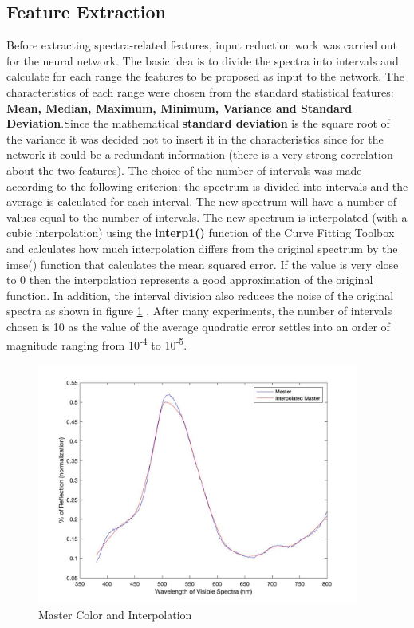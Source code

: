 \documentclass{article}
\begin{document}
\subsection{Feature Extraction} 
Before extracting spectra-related features, input reduction work was carried out for the neural network. The basic idea is to divide the spectra into intervals and calculate for each range the features to be proposed as input to the network. The characteristics of each range were chosen from the standard statistical features: \textbf{Mean, Median, Maximum, Minimum, Variance and Standard Deviation}.Since the mathematical \textbf{standard deviation} is the square root of the variance it was decided not to insert it in the characteristics since for the network it could be a redundant information (there is a very strong correlation about the two features). The choice of the number of intervals was made according to the following criterion: the spectrum is divided into intervals and the average is calculated for each interval. The new spectrum will have a number of values equal to the number of intervals. The new spectrum is interpolated (with a cubic interpolation) using the \textbf{interp1()} function of the Curve Fitting Toolbox and calculates how much interpolation differs from the original spectrum by the imse() function that calculates the mean squared error. If the value is very close to 0 then the interpolation represents a good approximation of the original function. In addition, the interval division also reduces the noise of the original spectra as shown in figure \ref{fig:interpolation} . After many experiments, the number of intervals chosen is 10 as the value of the average quadratic error settles into an order of magnitude ranging from 10\textsuperscript{-4} to 10\textsuperscript{-5}.
\begin{figure}[!h]
\center
  \includegraphics[width=300pt]{img/interpolation.jpg}
  \caption{Master Color and Interpolation}
  \label{fig:interpolation}
\end{figure}
\end{document}
